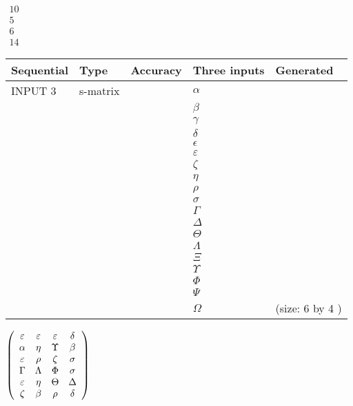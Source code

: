 \documentclass[12pt]{article}
\begin{document}
   
 $\begin{array}{
 c
 }
          10  \\ 
           5  \\ 
           6  \\ 
          14
\end{array}  $ 
  
  
\noindent\begin{tabular}{|l|l|l|l|l|}
\hline
 Sequential & Type & Accuracy & Three inputs & Generated \\ 
\hline
 
 
  INPUT $            3 $ & s-matrix & & 
 $  \alpha $ & 
  \\
  & & & 
 $  \beta $ & 
  \\
  & & & 
 $  \gamma $ & 
  \\
  & & & 
 $  \delta $ & 
  \\
  & & & 
 $  \epsilon $ & 
  \\
  & & & 
 $  \varepsilon $ & 
  \\
  & & & 
 $                     \zeta $ & 
  \\
  & & & 
 $  \eta $ & 
  \\
  & & & 
 $  \rho $ & 
  \\
  & & & 
 $  \sigma $ & 
  \\
  & & & 
 $  \Gamma $ & 
  \\
  & & & 
 $  \Delta $ & 
  \\
  & & & 
 $  \Theta $ & 
  \\
  & & & 
 $  \Lambda $ & 
  \\
  & & & 
 $                     \Xi $ & 
  \\
  & & & 
 $  \Upsilon $ & 
  \\
  & & & 
 $  \Phi $ & 
  \\
  & & & 
 $  \Psi $ & 
  \\
  & & & 
 $  \Omega $ & 
  (size:            6  by            4 )
 \\  \hline  
 \end{tabular}
   
   
 $  \left( \begin{array}
 {
 c
 c
 c
 c
 }
 \varepsilon & 
 \varepsilon & 
 \varepsilon & 
 \delta \\ 
 \alpha & 
 \eta & 
 \Upsilon & 
 \beta \\ 
 \varepsilon & 
 \rho & 
                    \zeta & 
 \sigma \\ 
 \Gamma & 
 \Lambda & 
 \Phi & 
 \sigma \\ 
 \varepsilon & 
 \eta & 
 \Theta & 
 \Delta \\ 
                    \zeta & 
 \beta & 
 \rho & 
 \delta
 \end{array} \right) $ 
  
\end{document}
